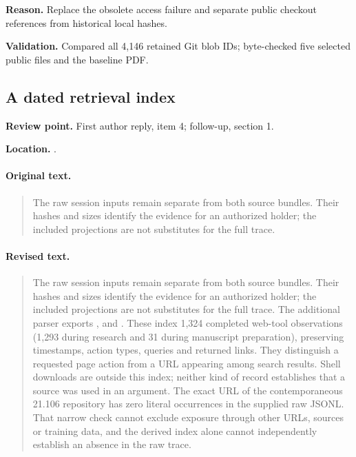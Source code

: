 \noindent\textbf{Reason.} Replace the obsolete access failure and separate public checkout references from historical local hashes.

\noindent\textbf{Validation.} Compared all 4,146 retained Git blob IDs; byte-checked five selected public files and the baseline PDF.

\subsection{A dated retrieval index}
\noindent\textbf{Review point.} First author reply, item 4; follow-up, section 1.\par
\noindent\textbf{Location.} .

\paragraph{Original text.}
\begin{quote}\small
The raw session inputs remain separate from both source bundles.
Their hashes and sizes identify the evidence for an authorized holder;
the included projections are not substitutes for the full trace.
\end{quote}

\paragraph{Revised text.}
\begin{quote}\small
The raw session inputs remain separate from both source bundles.
Their hashes and sizes identify the evidence for an authorized holder;
the included projections are not substitutes for the full trace.
The additional  parser exports
, 
and . These index 1,324 completed
web-tool observations (1,293 during research and 31 during manuscript
preparation), preserving timestamps, action types, queries and returned
links. They distinguish a requested page action from a URL appearing
among search results. Shell downloads are outside this index; neither
kind of record establishes that a source was used in an argument.
The exact URL of the contemporaneous 21.106 repository has zero literal
occurrences in the supplied raw JSONL. That narrow check cannot exclude
exposure through other URLs, sources or training data, and the derived
index alone cannot independently establish an absence in the raw trace.
\end{quote}

